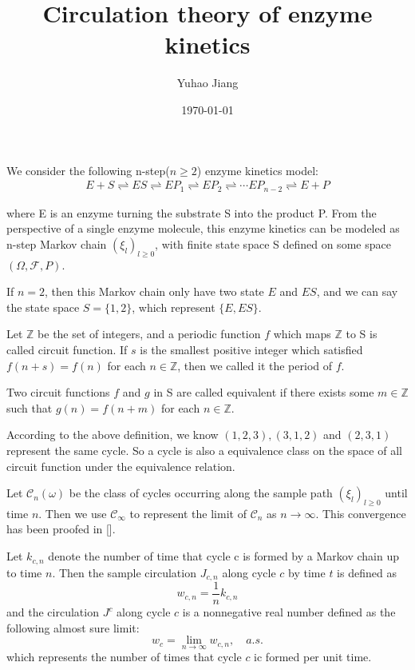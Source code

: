 \documentclass[11pt,en,cite=authoryear]{elegantpaper}
\title{Circulation theory of enzyme kinetics}
\author{Yuhao Jiang}
\date{\today}
\begin{document}
\maketitle
We consider the following n-step($n\ge 2$) enzyme kinetics model:
\begin{align} \label{eq:model}
    E + S \rightleftharpoons
    ES \rightleftharpoons
    EP_1 \rightleftharpoons
    EP_2 \rightleftharpoons
    \cdots
    EP_{n-2} \rightleftharpoons
    E + P
\end{align}

where E is an enzyme turning the substrate S into the product P. From the  perspective of a single enzyme molecule, this enzyme kinetics can be modeled as n-step Markov chain $(\xi_l)_{l\ge 0}$, with finite state space S defined on some space $(\Omega, \mathcal{F}, P)$. 

If $n=2$, then this Markov chain only have two state $E$ and $ES$, and we can say the state space $S=\{1, 2\}$, which represent $\{E, ES\}$.

\begin{definition}
    Let $\mathbb{Z}$ be the set of integers, and a periodic function $f$ which maps $\mathbb{Z}$ to S is called circuit function. If $s$ is the smallest positive integer which satisfied $f(n+s) = f(n)$ for each $n \in \mathbb{Z}$, then we called it the period of $f$.
\end{definition}

\begin{definition}
    Two circuit functions $f$ and $g$ in S are called equivalent if there exists some $m \in \mathbb{Z}$ such that $g(n) = f(n+m)$ for each $n \in \mathbb{Z}$.
\end{definition}


According to the above definition, we know $(1, 2, 3), (3, 1, 2)$ and $(2, 3, 1)$ represent the same cycle. So a cycle is also a equivalence class on the space of all
circuit function under the equivalence relation.

\begin{definition}
    Let $\mathcal{C}_n(\omega)$ be the class of cycles occurring along the sample path $(\xi_l)_{l\ge 0}$ until time $n$. Then we use $\mathcal{C}_{\infty}$ to represent the limit of $\mathcal{C}_n$ as $n \rightarrow \infty$. This convergence has been proofed in [].
\end{definition}



\begin{definition} %
    Let $k_{c, n}$ denote the number of time that cycle c is formed by a Markov chain up to time $n$. Then the sample circulation $J_{c, n}$ along cycle $c$ by time $t$ is defined as
    $$
    w_{c, n} = \frac{1}{n} k_{c, n}
    $$
    and the circulation $J^c$ along cycle $c$ is a nonnegative real number defined as the following almost sure limit:
    $$
    w_c = \lim_{n \rightarrow \infty} w_{c, n}, \quad a.s.
    $$
    which represents the number of times that cycle $c$ ic formed per unit time.
\end{definition}
\end{document}
